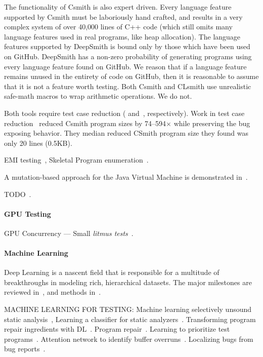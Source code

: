 The functionality of Csmith is also expert driven. Every language feature supported by Csmith must be laboriously hand crafted, and results in a very complex system of over 40,000 lines of C++ code (which still omits many language features used in real programs, like heap allocation). The language features supported by DeepSmith is bound only by those which have been used on GitHub. DeepSmith has a non-zero probability of generating programs using every language feature found on GitHub. We reason that if a language feature remains unused in the entirety of code on GitHub, then it is reasonable to assume that it is not a feature worth testing. Both Csmith and CLsmith use unrealistic safe-math macros to wrap arithmetic operations. We do not.

Both tools require test case reduction (\cite{Regehr2012a} and~\cite{Pflanzer2016}, respectively). Work in test case reduction~\cite{Regehr2012a} reduced Csmith program sizes by 74--594$\times$ while preserving the bug exposing behavior. They median reduced CSmith program size they found was only 20 lines (0.5KB).


EMI testing~\cite{Le2013a}, Skeletal Program enumeration~\cite{Zhang2017a}.

A mutation-based approach for the Java Virtual Machine is demonstrated in~\cite{Chena}.

TODO~\cite{White2016}.

\paragraph{GPU Testing} GPU Concurrency --- Small \emph{litmus tests}~\cite{Alglave2015}.


\paragraph{Machine Learning} Deep Learning is a nascent field that is responsible for a multitude of breakthroughs in modeling rich, hierarchical datasets. The major milestones are reviewed in~\cite{Wang2017}, and methods in~\cite{Schmidhuber2014}.

MACHINE LEARNING FOR TESTING: Machine learning selectively unsound static analysis~\cite{Heo2017}, Learning a classifier for static analyzers~\cite{Koc2017}.
Transforming program repair ingredients with DL~\cite{White}. Program repair~\cite{Koukoutos2017a}. Learning to prioritize test programs~\cite{Chen2017}. Attention network to identify buffer overruns~\cite{Choi2016}. Localizing bugs from bug reports~\cite{Lam2016,Huo2016}.

